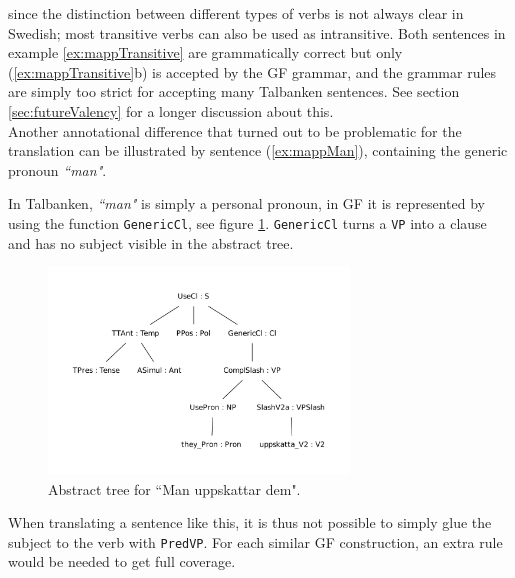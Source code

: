 \documentclass{report}
\begin{document}
\noindent since the distinction between different types of verbs is not always clear in Swedish;
most transitive verbs can also be used as intransitive. Both sentences in
example \ref{ex:mappTransitive} are grammatically correct but only (\ref{ex:mappTransitive}b)
is accepted by the GF grammar, and
the grammar rules are simply too strict for accepting many Talbanken sentences.
\label{ex:mappTransitive}
See section \ref{sec:futureValency} for a longer discussion about this.\\

Another annotational difference that turned out to be problematic for the
translation can be illustrated by sentence (\ref{ex:mappMan}), containing
the generic pronoun \emph{``man"}.
\label{ex:mappMan} %

In Talbanken, \emph{``man"} is simply a personal pronoun, 
in GF it is represented by using the function \verb|GenericCl|, see figure
\ref{fig:mappMan}. \verb|GenericCl| turns a \verb-VP- into a clause and has no
subject visible in the abstract tree. 
\begin{figure}[h]
\centering
\includegraphics[width=80mm]{man.pdf}
\caption{Abstract tree for ``Man uppskattar dem".}
\label{fig:mappMan}
\end{figure}
When translating a sentence like this, it is thus not possible to simply glue the
subject to the verb with \verb|PredVP|. For each similar GF construction, an extra rule
would be needed to get full coverage. \\ %
\end{document}

